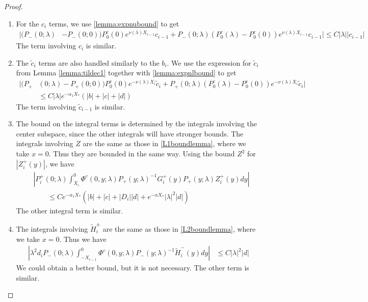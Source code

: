\documentclass[thesis.tex]{subfiles}
\begin{document}
\begin{lemma}
\begin{proof}
\begin{enumerate}
\item For the $c_i$ terms, we use \cref{lemma:expnubound} to get
\begin{align*}
|(P_-(0; \lambda) &- P_-(0; 0)) P_0^c(0) e^{\nu(\lambda) X_{i-1}} c_{i-1} + P_-(0; \lambda) (P_0^c(\lambda) - P_0^c(0)) e^{\nu(\lambda) X_{i-1}} c_{i-1} | \leq C |\lambda|| c_{i-1} |
\end{align*}
The term involving $c_i$ is similar.

\item The $\tilde{c}_i$ terms are also handled  similarly to the $b_i$. We use the expression for $\tilde{c}_i$ from Lemma \ref{lemma:tildec1} together with \cref{lemma:expnlbound} to get
\begin{align*}
|(P_+&(0; \lambda) - P_+(0; 0))P_0^c(0) e^{-\nu(\lambda)X_i} \tilde{c}_i + P_+(0; \lambda) (P_0^c(\lambda) - P_0^c(0)) e^{-\nu(\lambda)X_i} \tilde{c}_i| \\
&\leq C |\lambda| e^{-\alpha_1 X_*} \left( |b| + |c| + |d| \right)
\end{align*}
The term involving $\tilde{c}_{i-1}$ is similar.

\item The bound on the integral terms is determined by the integrals involving the center subspace, since the other integrals will have stronger bounds. The integrals involving $Z$ are the same as those in \cref{L1boundlemma}, where we take $x = 0$. Thus they are bounded in the same way. Using the bound $Z^2$ for $| Z_i^+(y)|$, we have 
\begin{align*}
&\left| P_i^+(0; \lambda) \int_{X_i}^0 \Phi^c(0, y; \lambda) P_+(y; \lambda)^{-1} G_i^+(y) P_+(y; \lambda) Z_i^+(y) dy \right| \\
&\qquad \leq C e^{-\alpha_1 X_*} \left(|b| + |c| + |D_i||d| + e^{-\alpha X_*}|\lambda|^2|d|\right)
\end{align*}
The other integral term is similar.

\item The integrals involving $\tilde{H}_i^\pm$ are the same as those in \cref{L2boundlemma}, where we take $x = 0$. Thus we have
\begin{align*}
\left| \lambda^2 d_i P_-(0; \lambda) \int_{-X_{i-1}}^0 \Phi^c(0, y; \lambda) P_-(y; \lambda)^{-1} \tilde{H}_i^-(y) dy \right| &\leq C |\lambda|^2 |d| 
\end{align*}
We could obtain a better bound, but it is not necessary. The other term is similar.
\end{enumerate}


\end{proof}
\end{lemma}
\end{document}

